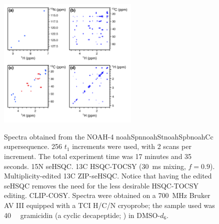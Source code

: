 \documentclass[11pt]{article}
\newcommand*{\noahfour}[4]{\csname noah#1\endcsname\csname noah#2\endcsname\csname noah#3\endcsname\csname noah#4\endcsname}
\newcommand*{\carbon}{13C}
\newcommand*{\nitrogen}{15N}
\begin{document}
\begin{refsection}
\begin{figure}
    \centering
    \includegraphics[width=0.6\textwidth]{spnstspcc.png}
    {\label{fig:spnstspcc_spn}}
    {\label{fig:spnstspcc_st}}
    {\label{fig:spnstspcc_sp}}
    {\label{fig:spnstspcc_cc}}
    \caption{
        Spectra obtained from the NOAH-4 \noahfour{Spn}{St}{Spb}{Cc} supersequence.
        256 $t_1$ increments were used, with 2 scans per increment.
        The total experiment time was 17 minutes and 35 seconds.
        \textbf{} \nitrogen{} seHSQC.
        \textbf{} \carbon{} HSQC-TOCSY (\SI{30}{ms} mixing, $f = 0.9$).
        \textbf{} Multiplicity-edited \carbon{} ZIP-seHSQC. Notice that having the edited seHSQC removes the need for the less desirable HSQC-TOCSY editing.
        \textbf{} CLIP-COSY.
        Spectra were obtained on a \SI{700}{\MHz} Bruker AV III equipped with a TCI H/C/N cryoprobe; the sample used was \SI{40}{\milli\molar} gramicidin (a cyclic decapeptide; ) in DMSO-$d_6$.
    }
    \label{fig:spnstspcc}
\end{figure}


\end{refsection}
\end{document}
